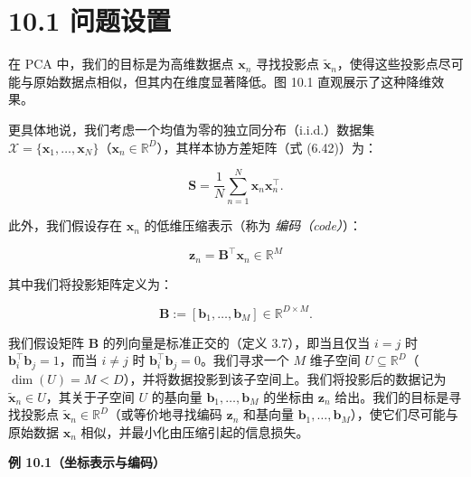 \section*{10.1 问题设置}
\label{sec:10.1}

在 PCA 中，我们的目标是为高维数据点 $ \boldsymbol{x}_n $ 寻找投影点 $ \tilde{\boldsymbol{x}}_n $，使得这些投影点尽可能与原始数据点相似，但其内在维度显著降低。图 10.1 直观展示了这种降维效果。

更具体地说，我们考虑一个均值为零的独立同分布（i.i.d.）数据集 $ \mathcal{X} = \{\boldsymbol{x}_1, \ldots, \boldsymbol{x}_N\} $（$ \boldsymbol{x}_n \in \mathbb{R}^D $），其样本协方差矩阵（式 (6.42)）为：

\begin{equation}
\boldsymbol{S} = \frac{1}{N}\sum_{n=1}^N \boldsymbol{x}_n \boldsymbol{x}_n^\top .
\tag{10.1}
\end{equation}

此外，我们假设存在 $ \boldsymbol{x}_n $ 的低维压缩表示（称为 \emph{编码（code）}）：

\begin{equation}
\boldsymbol{z}_n = \boldsymbol{B}^\top \boldsymbol{x}_n \in \mathbb{R}^M
\tag{10.2}
\end{equation}

其中我们将投影矩阵定义为：

\begin{equation}
\boldsymbol{B} := [\boldsymbol{b}_1, \ldots, \boldsymbol{b}_M] \in \mathbb{R}^{D \times M} .
\tag{10.3}
\end{equation}

我们假设矩阵 $ \boldsymbol{B} $ 的列向量是标准正交的（定义 3.7），即当且仅当 $ i = j $ 时 $ \boldsymbol{b}_i^\top \boldsymbol{b}_j = 1 $，而当 $ i \neq j $ 时 $ \boldsymbol{b}_i^\top \boldsymbol{b}_j = 0 $。我们寻求一个 $ M $ 维子空间 $ U \subseteq \mathbb{R}^D $（$ \dim(U) = M < D $），并将数据投影到该子空间上。我们将投影后的数据记为 $ \tilde{\boldsymbol{x}}_n \in U $，其关于子空间 $ U $ 的基向量 $ \boldsymbol{b}_1, \ldots, \boldsymbol{b}_M $ 的坐标由 $ \boldsymbol{z}_n $ 给出。我们的目标是寻找投影点 $ \tilde{\boldsymbol{x}}_n \in \mathbb{R}^D $（或等价地寻找编码 $ \boldsymbol{z}_n $ 和基向量 $ \boldsymbol{b}_1, \ldots, \boldsymbol{b}_M $），使它们尽可能与原始数据 $ \boldsymbol{x}_n $ 相似，并最小化由压缩引起的信息损失。

\begin{notebox}
\textbf{例 10.1（坐标表示与编码）}
\end{notebox}

